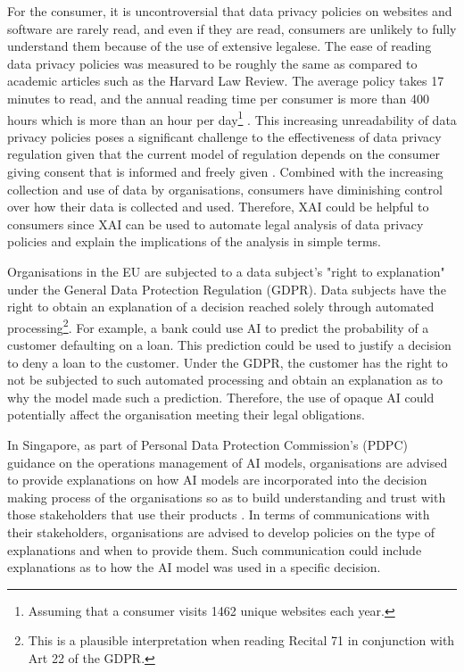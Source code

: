For the consumer, it is uncontroversial that data privacy policies on websites and software are rarely read, and even if they are read, consumers are unlikely to fully understand them because of the use of extensive legalese. The ease of reading data privacy policies was measured to be roughly the same as compared to academic articles such as the Harvard Law Review. The average policy takes 17 minutes to read, and the annual reading time per consumer is more than 400 hours which is more than an hour per day\footnote{Assuming that a consumer visits 1462 unique websites each year.} \cite{wagner2022privacy}. This increasing unreadability of data privacy policies poses a significant challenge to the effectiveness of data privacy regulation given that the current model of regulation depends on the consumer giving consent that is informed and freely given \cite{mantelero_2014}. Combined with the increasing collection and use of data by organisations, consumers have diminishing control over how their data is collected and used. Therefore, XAI could be helpful to consumers since XAI can be used to automate legal analysis of data privacy policies and explain the implications of the analysis in simple terms.

Organisations in the EU are subjected to a data subject's "right to explanation" under the General Data Protection Regulation (GDPR). Data subjects have the right to obtain an explanation of a decision reached solely through automated processing\footnote{This is a plausible interpretation when reading Recital 71 in conjunction with Art 22 of the GDPR.}. For example, a bank could use AI to predict the probability of a customer defaulting on a loan. This prediction could be used to justify a decision to deny a loan to the customer. Under the GDPR, the customer has the right to not be subjected to such automated processing and obtain an explanation as to why the model made such a prediction. Therefore, the use of opaque AI could potentially affect the organisation meeting their legal obligations.

In Singapore, as part of Personal Data Protection Commission's (PDPC) guidance on the operations management of AI models, organisations are advised to provide explanations on how AI models are incorporated into the decision making process of the organisations so as to build understanding and trust with those stakeholders that use their products \cite{ai_modelframework}. In terms of communications with their stakeholders, organisations are advised to develop policies on the type of explanations and when to provide them. Such communication could include explanations as to how the AI model was used in a specific decision. 

